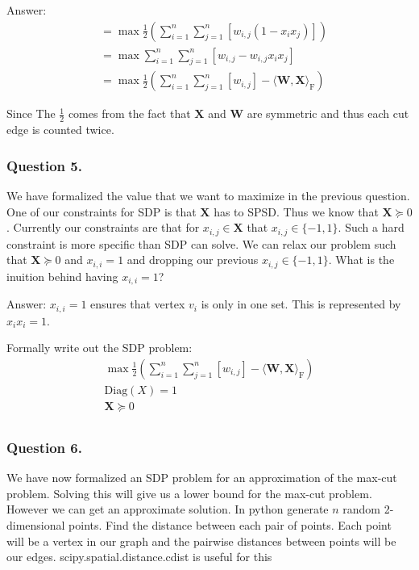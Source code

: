 \documentclass{article}
\begin{document}
Answer:
\begin{align*}
 &= \max \frac{1}{2} \left (\sum_{i = 1}^n \sum_{j = 1}^n[ w_{i, j}(1 - x_i x_j) ] \right)\\
 &= \max  \sum_{i = 1}^n \sum_{j = 1}^n[ w_{i, j} - w_{i, j} x_i x_j ]\\
 &= \max \frac{1}{2} \left ( \sum_{i = 1}^n \sum_{j = 1}^n[w_{i, j}] - \langle \mathbf{W}, \mathbf{X} \rangle_{\mathrm{F}} \right )
\end{align*}

Since 
The \( \frac{1}{2} \) comes from the fact that \( \mathbf{X} \) and \( \mathbf{W} \) are symmetric and thus each cut edge is counted twice.

\subsubsection{Question 5.}
We have formalized the value that we want to maximize in the previous question.
One of our constraints for SDP is that \( \mathbf{X} \) has to SPSD.
Thus we know that \( \mathbf{X} \succeq 0 \).
Currently our constraints are that for \( x_{i, j} \in \mathbf{X} \) that \( x_{i, j} \in \{ -1, 1 \} \).
Such a hard constraint is more specific than SDP can solve.
We can relax our problem such that \( \mathbf{X} \succeq 0\) and \( x_{i, i} = 1 \) and dropping our previous \( x_{i, j} \in \{ -1, 1 \} \).
What is the inuition behind having \( x_{i, i} = 1 \)?

Answer: \( x_{i, i} = 1 \) ensures that vertex \( v_i \) is only in one set. This is represented by \( x_i x_i = 1 \).

Formally write out the SDP problem:
\begin{gather*}
\max \frac{1}{2} \left ( \sum_{i = 1}^n \sum_{j = 1}^n[w_{i, j}] - \langle \mathbf{W}, \mathbf{X} \rangle_{\mathrm{F}} \right ) \\
\text{Diag}(X) = 1 \\
\mathbf{X} \succeq 0 \\
\end{gather*}

\subsubsection{Question 6.}
We have now formalized an SDP problem for an approximation of the max-cut problem. Solving this will give us a lower bound for the max-cut problem. However we can get an approximate solution.
In python generate \( n \) random 2-dimensional points.
Find the distance between each pair of points. Each point will be a vertex in our graph and the pairwise distances between points will be our edges.
scipy.spatial.distance.cdist is useful for this
\end{document}
